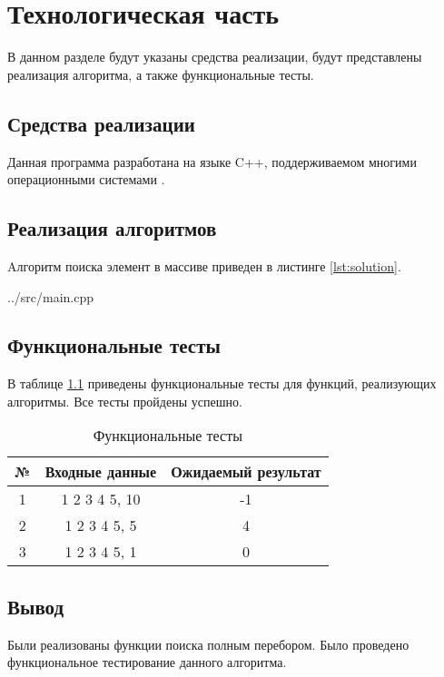 \chapter{Технологическая часть}

В данном разделе будут указаны средства реализации, будут представлены реализация алгоритма, а также функциональные тесты.



\section{Средства реализации}

Данная программа разработана на языке C++, поддерживаемом многими операционными системами \cite{bib2}.



\section{Реализация алгоритмов}

Aлгоритм поиска элемент в массиве приведен в листинге \ref{lst:solution}.

\begin{lstinputlisting}[
	caption={Алгоритм поиска элемента в массиве},
	label={lst:solution},
	linerange={5-15}
	]{../src/main.cpp}
\end{lstinputlisting}

\clearpage
 
\section{Функциональные тесты}

В таблице \ref{tbl:tests} приведены функциональные тесты для функций, реализующих алгоритмы. Все тесты пройдены успешно.

\begin{table}[h]
	\begin{center}
		\begin{threeparttable}
			\captionsetup{justification=raggedright,singlelinecheck=off}
			\caption{\label{tbl:tests} Функциональные тесты}
			\begin{tabular}{|c|c|c|}
				\hline
				№&Входные данные& Ожидаемый результат \\
				\hline
				1&1 2 3 4 5, 10& -1\\
				\hline
				2&1 2 3 4 5, 5& 4\\
				\hline
				3&1 2 3 4 5, 1& 0\\
				\hline
			\end{tabular}
		\end{threeparttable}
	\end{center}
\end{table}

\section*{Вывод}
Были реализованы функции поиска полным перебором.
Было проведено функциональное тестирование данного алгоритма.